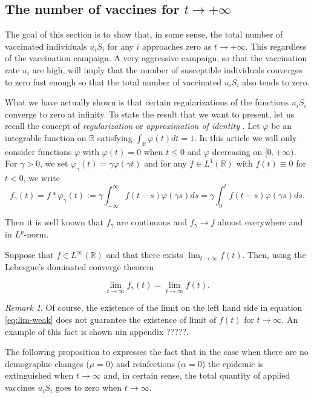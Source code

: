 \documentclass[a4paper,10pt]{article}
\theoremstyle{remark}
\newtheorem{comentario}{Remark}
\begin{document}
\subsection{The number of vaccines  for  $t\to +\infty$}

The goal of this section is to show that, in some sense, the total number of vaccinated individuals $u_iS_i$ for any $i$ approaches zero as $t\to+\infty$. This regardless of the vaccination campaign. A very aggressive campaign, so that the vaccination rate $u_i$ are high, will imply that the number of susceptible individuals converges to zero fast enough so that the total number of vaccinated $u_iS_i$ also tends to zero.

What we have actually shown is that certain regularizations of the functions $u_iS_i$ converge to zero at infinity. To state the result that we want to present, let us recall the concept of \emph{regularization} or \emph{approximation of identity}  \cite{EliasM.Stein120}. Let $\varphi$ be an  integrable function on $\mathbb{R}$ satisfying $\int_\mathbb{R}\varphi(t)dt=1$.  In this article we will only consider functions $\varphi$  with $\varphi(t)=0$ when $t\leq 0$ and $\varphi$ decreasing on $[0,+\infty)$. For $\gamma>0$, we set $\varphi_\gamma(t)=\gamma\varphi(\gamma t)$ and for any $f\in L^1(\mathbb{R})$ with $f(t)\equiv 0$ for $t<0$, we write
\[
 f_{\gamma}(t)=f\ast \varphi_\gamma (t):= \gamma\int_{-\infty}^\infty f(t-s)\varphi(\gamma s)ds= \gamma\int_0^t f(t-s)\varphi(\gamma s)ds. 
\]

Then it is well known \cite{EliasM.Stein120} that $f_\gamma$ are continuous and  $f_\gamma\to f$  almost everywhere and in $L^p$-norm.  

 Suppose that $f\in L^\infty(\mathbb{R})$ and that there exists  $\lim_{t\to\infty}f(t)$.   Then, using the Lebesgue's dominated converge theorem 

 \begin{equation}\label{eq:lim-weak}
 \lim_{t\to\infty}f_\gamma(t) =\lim_{t\to\infty}f(t).
\end{equation}


\begin{comentario} Of course, the existence of the limit on the left hand side in equation \eqref{eq:lim-weak}   does not guarantee the existence of limit of $f(t)$ for $t\to\infty$. An example of this fact is shown uin appendix ?????.
\end{comentario}

The following proposition to expresses the fact that in the case when there are no demographic changes ($\mu=0$) and reinfections ($\alpha=0$) the  epidemic is extinguished when $t\to\infty$ and, in certain sense, the total quantity of applied vaccines $ u_iS_i$ goes to zero when $t\to\infty$.   
\end{document}
